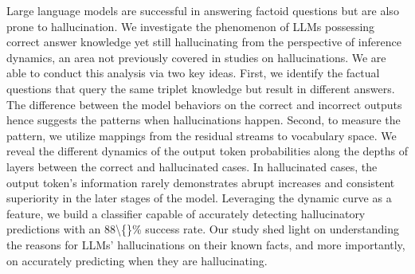 Large language models are successful in answering factoid questions but are also prone to hallucination. We investigate the phenomenon of LLMs possessing correct answer knowledge yet still hallucinating from the perspective of inference dynamics, an area not previously covered in studies on hallucinations. We are able to conduct this analysis via two key ideas. First, we identify the factual questions that query the same triplet knowledge but result in different answers. The difference between the model behaviors on the correct and incorrect outputs hence suggests the patterns when hallucinations happen. Second, to measure the pattern, we utilize mappings from the residual streams to vocabulary space. We reveal the different dynamics of the output token probabilities along the depths of layers between the correct and hallucinated cases.  In hallucinated cases, the output token's information rarely demonstrates abrupt increases and consistent superiority in the later stages of the model. Leveraging the dynamic curve as a feature, we build a classifier capable of accurately detecting hallucinatory predictions with an 88\textbackslash\{\}\% success rate.  Our study shed light on understanding the reasons for LLMs' hallucinations on their known facts, and more importantly, on accurately predicting when they are hallucinating.